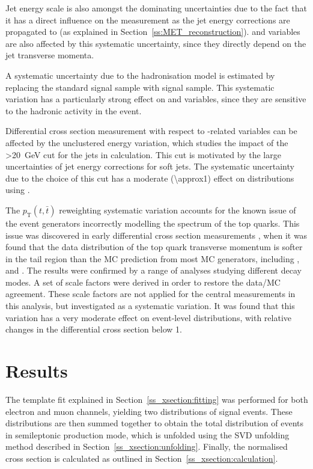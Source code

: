 Jet energy scale is also amongst the dominating uncertainties due to the fact that it has a direct influence on the \MET
measurement as the jet energy corrections are propagated to \MET (as explained in Section~\ref{ss:MET_reconstruction}).
\HT and \ST variables are also affected by this systematic uncertainty, since they directly depend on the jet transverse
momenta.

A systematic uncertainty due to the hadronisation model is estimated by replacing the standard \MADGRAPH \ttbar signal
sample with \MCATNLO signal sample. This systematic variation has a particularly strong effect on \HT and \ST variables,
since they are sensitive to the hadronic activity in the event.

Differential cross section measurement with respect to \MET-related variables can be affected by the unclustered energy
variation, which studies the impact of the \pt\SI{>20}{\GeV} cut for the jets in \MET calculation. This cut is
motivated by the large uncertainties of jet energy corrections for soft jets. The systematic uncertainty due to the
choice of this cut has a moderate (\SI{\approx1}{\pc}) effect on distributions using \MET.

The $p_\mathrm{T}(t,\bar{t})$ reweighting systematic variation accounts for the known issue of the event generators
incorrectly modelling the \pt spectrum of the top quarks. This issue was discovered in early differential cross section
measurements \autocite{CMS_diff_xsections_7TeV}, when it was found that the data distribution of the top quark
transverse momentum is softer in the tail region than the MC prediction from most MC generators, including \MADGRAPH,
\POWHEG and \MCATNLO. The results were confirmed by a range of analyses studying different \ttbar decay modes. A set of
scale factors were derived in order to restore the data/MC agreement. These scale factors are not applied for the
central measurements in this analysis, but investigated as a systematic variation. It was found that this variation has
a very moderate effect on event-level distributions, with relative changes in the differential cross section below
\SI{1}{\pc}.



\section{Results}
\label{s_xsection:results}
The template fit explained in Section~\ref{ss_xsection:fitting} was performed for both electron and muon channels,
yielding two distributions of signal \ttbar events. These distributions are then summed together to obtain the total
distribution of \ttbar events in semileptonic production mode, which is unfolded using the SVD unfolding method
described in Section~\ref{ss_xsection:unfolding}. Finally, the normalised cross section is calculated as outlined in
Section~\ref{ss_xsection:calculation}.

